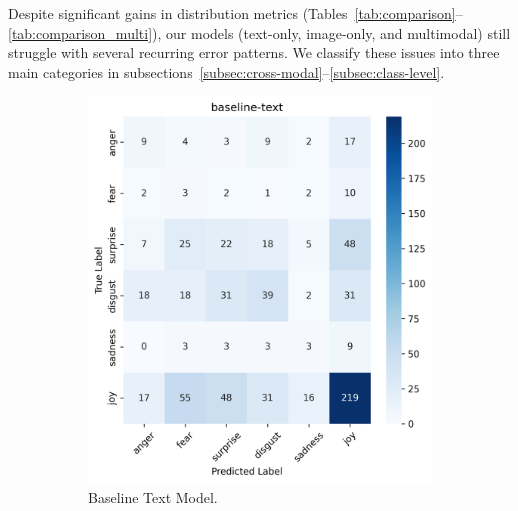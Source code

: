 Despite significant gains in distribution metrics (Tables~\ref{tab:comparison}--\ref{tab:comparison_multi}), our models (text-only, image-only, and multimodal) still struggle with several recurring error patterns. We classify these issues into three main categories in subsections~\ref{subsec:cross-modal}--\ref{subsec:class-level}.

\begin{figure}[ht]
    \centering
    \begin{subfigure}[b]{0.48\textwidth}
        \includegraphics[width=\textwidth]{images/confusion_matrix_baseline_text_dist.png}
        \caption{Baseline Text Model.}
        \label{fig:text-confusion-baseline}
    \end{subfigure}
    \hfill
    \begin{subfigure}[b]{0.48\textwidth}

\end{subfigure}
\end{figure}
